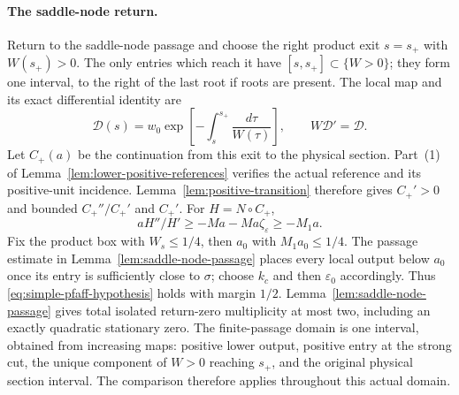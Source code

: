 \paragraph{The saddle-node return.}
Return to the saddle-node passage and choose the right product exit
$s=s_+$ with $W(s_+)>0$.
The only entries which reach it have $[s,s_+]\subset\{W>0\}$;
they form one interval, to the right of the last root if roots are present.
The local map and its exact differential identity are
\begin{equation}\label{eq:lower-node-map}
 \mathcal D(s)=w_0\exp\left[-\int_s^{s_+}\frac{d\tau}{W(\tau)}\right],
 \qquad W\mathcal D'=\mathcal D .
\end{equation}
Let $C_+(a)$ be the continuation from this exit to the physical section.
Part~(1) of Lemma~\ref{lem:lower-positive-references} verifies the actual
reference and its positive-unit incidence.  Lemma~\ref{lem:positive-transition}
therefore gives $C_+'>0$ and bounded
$C_+''/C_+'$ and $C_+'$. For $H=N\circ C_+$,
\[
 aH''/H'\ge-Ma-Ma\zeta_\varepsilon\ge-M_1a.
\]
Fix the product box with $W_s\le1/4$, then $a_0$ with
$M_1a_0\le1/4$. The passage estimate in
Lemma~\ref{lem:saddle-node-passage} places every local output below
$a_0$ once its entry is sufficiently close to $\sigma$; choose $k_c$
and then $\varepsilon_0$ accordingly. Thus \eqref{eq:simple-pfaff-hypothesis} holds with margin $1/2$.
Lemma~\ref{lem:saddle-node-passage} gives total isolated return-zero
multiplicity at most two, including an exactly quadratic stationary zero.
The finite-passage domain is one interval, obtained from increasing maps:
positive lower output, positive entry at the strong cut, the unique
component of $W>0$ reaching $s_+$, and the original physical section
interval. The comparison therefore applies throughout this actual domain.

